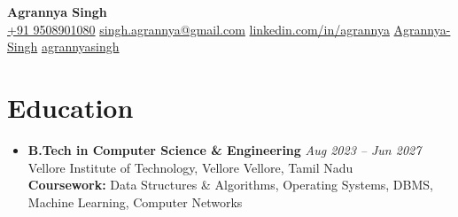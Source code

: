 \documentclass[10pt, a4paper]{article}
\begin{document}
\begin{center}
    {\Large \textbf{Agrannya Singh}} \\[0.2ex]
    \footnotesize
    \faPhoneSquare{} \href{tel:+919508901080}{+91 9508901080} \hspace{0.5em}\textbullet\hspace{0.5em}
    \faEnvelopeSquare{} \href{mailto:singh.agrannya@gmail.com}{singh.agrannya@gmail.com} \hspace{0.5em}\textbullet\hspace{0.5em}
    \faLinkedin{} \href{https://linkedin.com/in/agrannya}{linkedin.com/in/agrannya} \hspace{0.5em}\textbullet\hspace{0.5em}
    \faGithubSquare{} \href{https://github.com/Agrannya-Singh}{Agrannya-Singh} \hspace{0.5em}\textbullet\hspace{0.5em}
    \faKaggle{} \href{https://www.kaggle.com/agrannyasingh}{agrannyasingh}
\end{center}

\vspace{-1.8ex}

\section*{Education}
\begin{itemize}[label={}]
    \item \textbf{B.Tech in Computer Science \& Engineering} \hfill \textit{Aug 2023 -- Jun 2027} \\
    Vellore Institute of Technology, Vellore \hfill Vellore, Tamil Nadu \\
    \textbf{Coursework:} Data Structures \& Algorithms, Operating Systems, DBMS, Machine Learning, Computer Networks
\end{itemize}
\end{document}
